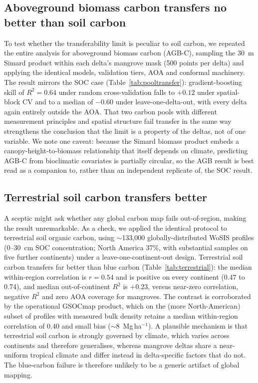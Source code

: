 \documentclass[11pt]{article}
\begin{document}
\subsection{Aboveground biomass carbon transfers no better than soil carbon}
To test whether the transferability limit is peculiar to soil carbon, we repeated the
entire analysis for aboveground biomass carbon (AGB-C), sampling the 30~m Simard
product within each delta's mangrove mask (500 points per delta) and applying the
identical models, validation tiers, AOA and conformal machinery. The result mirrors the
SOC case (Table~\ref{tab:pooltransfer}): gradient-boosting skill of $R^2=0.64$ under
random cross-validation falls to $+0.12$ under spatial-block CV and to a median of
$-0.60$ under leave-one-delta-out, with every delta again entirely outside the AOA.
That two carbon pools with different measurement principles and spatial structure
fail transfer in the same way strengthens the conclusion that the limit is a property
of the deltas, not of one variable. We note one caveat: because the Simard biomass
product embeds a canopy-height-to-biomass relationship that itself depends on climate,
predicting AGB-C from bioclimatic covariates is partially circular, so the AGB result
is best read as a companion to, rather than an independent replicate of, the SOC
result.

\begin{table}[t]
\centering
\caption{Transferability of the two carbon pools under the same gradient-boosting
model and validation tiers. Both collapse from strong random-CV skill to negative
leave-one-delta-out skill, with zero area-of-applicability coverage.}
\label{tab:pooltransfer}

\end{table}

\subsection{Terrestrial soil carbon transfers better}
A sceptic might ask whether any global carbon map fails out-of-region, making the result
unremarkable. As a check, we applied the identical protocol to terrestrial soil organic
carbon, using $\sim$133{,}000 globally-distributed WoSIS profiles (0--30~cm SOC
concentration; North America 37\%, with substantial samples on five further continents)
under a leave-one-continent-out design. Terrestrial soil carbon transfers far better than
blue carbon (Table~\ref{tab:terrestrial}): the median within-region correlation is
$r=0.54$ and is positive on every continent (0.47 to 0.74), and median out-of-continent
$R^2$ is $+0.23$, versus near-zero correlation, negative $R^2$ and zero AOA coverage for
mangroves. The contrast is corroborated by the operational GSOCmap product, which on the
(more North-American) subset of profiles with measured bulk density retains a median
within-region correlation of $0.40$ and small bias ($\sim$8~Mg\,ha$^{-1}$). A plausible
mechanism is that terrestrial soil carbon is strongly governed by climate, which varies
across continents and therefore generalises, whereas mangrove deltas share a near-uniform
tropical climate and differ instead in delta-specific factors that do not. The blue-carbon
failure is therefore unlikely to be a generic artifact of global mapping.
\end{document}
